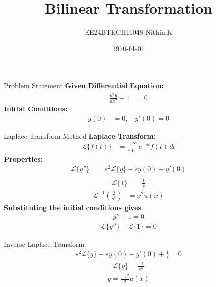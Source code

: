 \documentclass{beamer}
\title{Bilinear Transformation}
\author{EE24BTECH11048-Nithin.K}
\date{\today}
\begin{document}
\begin{frame}
	\titlepage
\end{frame}

\begin{frame}{Problem Statement}
	\textbf{Given Differential Equation:}
	\begin{align}
		\frac{d^2y}{dx^2} + 1 &= 0
	\end{align}
	\textbf{Initial Conditions:}
	\begin{align}
		y(0) &= 0, \quad y'(0) = 0
	\end{align}
\end{frame}

\begin{frame}{Laplace Transform Method}
	\textbf{Laplace Transform:}
	\begin{align}
		\mathcal{L}\{f(t)\} &= \int_{0}^{\infty} e^{-st} f(t) \, dt
	\end{align}
	\textbf{Properties:}
	\begin{align}
		\mathcal{L}\{y''\} &= s^2 \mathcal{L}\{y\} - s y(0) - y'(0) \\
	\end{align}
	\begin{align}
		\mathcal{L}\{1\} &= \frac{1}{s}
	\end{align}
	\begin{align}
		\mathcal{L}^{-1}\left(\frac{2}{s^3}\right) &= x^2 u(x)
	\end{align}
	\textbf{Substituting the initial conditions gives}
	\begin{align}
		y'' + 1 = 0
	\end{align}
	\begin{align}
		\mathcal{L}\{y''\} + \mathcal{L}\{1\} = 0
	\end{align}
\end{frame}

\begin{frame}{Inverse Laplace Transform}
        \begin{align}
	        s^2 \mathcal{L}\{y\} - sy\left(0\right) - y'\left(0\right) + \frac{1}{s} = 0
	\end{align}
	\begin{align}
	        \mathcal{L}\{y\} = \frac{-1}{s^3}
	\end{align}
	\begin{align}
	         y = \frac{-x^2}{2}u\left(x\right)
	\end{align}
\end{frame}
\end{document}
